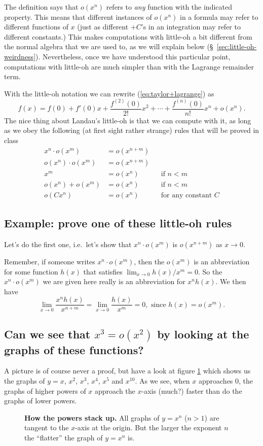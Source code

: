 The definition says that $o(x^n)$ refers to \emph{any} function with the
indicated property.  This means that different instances of $o(x^n)$ in a
formula may refer to different functions of $x$ (just as different $+C$'s in an
integration may refer to different constants.)  This makes computations with
little-oh a bit different from the normal algebra that we are used to, as we
will explain below (\S~\ref{sec:little-oh-weirdness}).  Nevertheless, once we
have understood this particular point, computations with little-oh are much
simpler than with the Lagrange remainder term.


With the little-oh notation we can rewrite (\ref{eq:taylor+lagrange}) as
\[
f(x) = f(0) + f'(0)x + \frac{f^{(2)}(0)}{2!} x^2 + \cdots +
\frac{f^{(n)}(0)}{n!} x^n + o (x^n).
\]
The nice thing about Landau's little-oh is that we  can compute with it, as
long as we  obey the following (at first sight rather strange) rules that
will be proved in class
\begin{align*}
  x^n\cdot o (x^m) & = o (x^{n+m})  \\
  o(x^n)\cdot o (x^m) & = o (x^{n+m})  \\
  x^m &=o(x^n)    &&\text{if $n<m$}\\
  o (x^n)+ o (x^m ) & = o (x^n)  &&\text{if $n<m$} \\
  o (Cx^n) &= o (x^n) &&\text{for any constant $C$}
\end{align*}
\subsection{Example: prove one of these little-oh rules} %
Let's do the first one, i.e.~let's show that $x^n\cdot o (x^m)$ is
$o(x^{n+m})$ as $x\to0$.

Remember, if someone writes $x^n\cdot o (x^m)$, then the $o (x^m)$ is an
abbreviation for some function $h(x)$ that satisfies
$\lim_{x\to0}h(x)/x^m=0$.  So the $x^n\cdot o (x^m)$ we are given here
really is an abbreviation for $x^nh(x)$. We then have
\[
\lim_{x\to0}\frac{x^nh(x)}{x^{n+m}} = \lim_{x\to0}\frac{h(x)}{x^{m}}
=0,\text{ since } h(x)=o(x^m).
\]

\subsection{Can we  see that $x^3=o (x^2)$ by looking at the graphs of %
these functions?}

A picture is of course never a proof, but have a look at figure
\ref{fig:stack-of-powers} which shows us the graphs of $y=x$, $x^2$,
$x^3$, $x^4$, $x^5$ and $x^{10}$.  As we see, when $x$ approaches $0$, the
graphs of higher powers of $x$ approach the $x$-axis (much?)  faster than
do the graphs of lower powers.
\begin{figure}[t]
  \centering \small  \normalsize
  \caption{\textbf{How the powers stack up.}  All graphs of $y=x^n$ ($n>1$)
  are tangent to the $x$-axis at the origin.  But the larger the exponent
  $n$ the ``flatter'' the graph of $y=x^n$ is.}
  \label{fig:stack-of-powers}
\end{figure}

